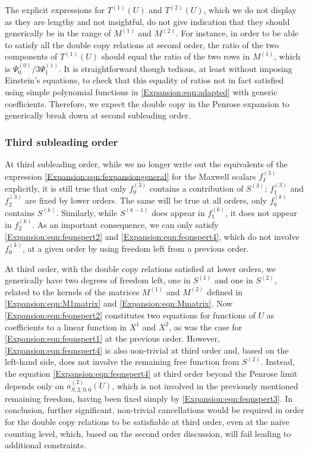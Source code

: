 The explicit expressions for $T^{(1)}(U)$ and $T^{(2)}(U)$, which we do not display as they are lengthy and not insightful, do not give indication that they should generically be in the range of $M^{(1)}$ and $M^{(2)}$. For instance, in order to be able to satisfy all the double copy relations at second order, the ratio of the two components of  $T^{(1)}(U)$ should equal the ratio of the two rows in $M^{(1)}$, which is $\Psi_0^{(0)}/3\Psi_1^{(1)}$. It is straightforward though tedious, at least without imposing Einstein's equations,  to check that this equality of ratios not in fact satisfied using simple polynomial functions in \eqref{Expansion:eqn:adapted} with generic coefficients. Therefore, we expect the double copy in the Penrose expansion to generically break down at second subleading order.

\subsubsection*{Third subleading order}

At third subleading order, while we no longer write out the equivalents of the expression \eqref{Expansion:eqn:fexpansiongeneral} for the Maxwell scalars $f^{(3)}_I$ explicitly, it is still true that only $f_0^{(3)}$ contains a contribution of $S^{(3)}$; $f^{(3)}_1$ and $f^{(3)}_2$ are fixed by lower orders. The same will be true at all orders, only $f_0^{(k)}$ contains $S^{(k)}$. Similarly, while $S^{(k-1)}$ does appear in $f_1^{(k)}$, it does not appear in $f_2^{(k)}$.  As an important consequence, we can only satisfy \eqref{Expansion:eqn:feqnspert2} and \eqref{Expansion:eqn:feqnspert4}, which do not involve $f_0^{(k)}$, at a given order by using freedom left from a previous order.

At third order, with the double copy relations satisfied at lower orders, we generically have two degrees of freedom left, one in $S^{(1)}$ and one in $S^{(2)}$, related to the kernels of the matrices $M^{(1)}$ and $M^{(2)}$ defined in \eqref{Expansion:eqn:M1matrix} and \eqref{Expansion:eqn:Mmatrix}. Now \eqref{Expansion:eqn:feqnspert2} constitutes two equations for functions of $U$ as coefficients to a linear function in $X^1$ and $X^2$, as was the case for \eqref{Expansion:eqn:feqnspert1} at the previous order. However, \eqref{Expansion:eqn:feqnspert4} is also non-trivial at third order and, based on the left-hand side, does not involve the remaining free function from $S^{(2)}$. Instead,  the equation \eqref{Expansion:eqn:feqnspert4} at third order beyond the Penrose limit depends only on $a^{(2)}_{S,2, 0,0}(U)$, which is not involved in the previously mentioned remaining freedom, having been fixed simply by \eqref{Expansion:eqn:feqnspert3}. In conclusion, further significant, non-trivial cancellations would be required in order for the double copy relations to be satisfiable at third order, even at the naive counting level, which, based on the second order discussion, will fail leading to additional constraints.  

